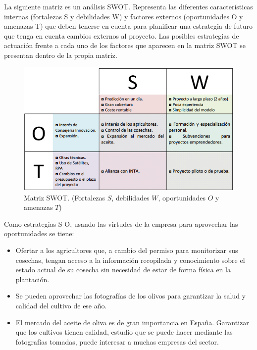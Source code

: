 \documentclass[12pt,oneside,a4paper]{article}
\numberwithin{figure}{section}
\begin{document}
La siguiente matriz es un análisis SWOT. Representa las diferentes características internas (fortalezas S y debilidades W) y factores externos (oportunidades O y amenazas T) que deben tenerse en cuenta para planificar una estrategia de futuro que tenga en cuenta cambios externos al proyecto. Las posibles estrategias de actuación frente a cada uno de los factores que aparecen en la matriz SWOT se presentan dentro de la propia matriz.

\begin{figure}[H]
\begin{center}
\includegraphics[scale=.7]{SWOT.png}
\caption{Matriz SWOT. (Fortalezas $S$, debilidades $W$, oportunidades $O$ y amenazas $T$)}
\label{fig:SWOT}
\end{center}
\end{figure}

Como estrategias S-O, usando las virtudes de la empresa para aprovechar las oportunidades se tiene:

\begin{itemize}
\item Ofertar a los agricultores que, a cambio del permiso para monitorizar sus cosechas, tengan acceso a la información recopilada y conocimiento sobre el estado actual de su cosecha sin necesidad de estar de forma física en la plantación.
\item Se pueden aprovechar las fotografías de los olivos para garantizar la salud y calidad del cultivo de ese año.
\item El mercado del aceite de oliva es de gran importancia en España. Garantizar que los cultivos tienen calidad, estudio que se puede hacer mediante las fotografías tomadas, puede interesar a muchas empresas del sector.
\end{itemize}
\end{document}
